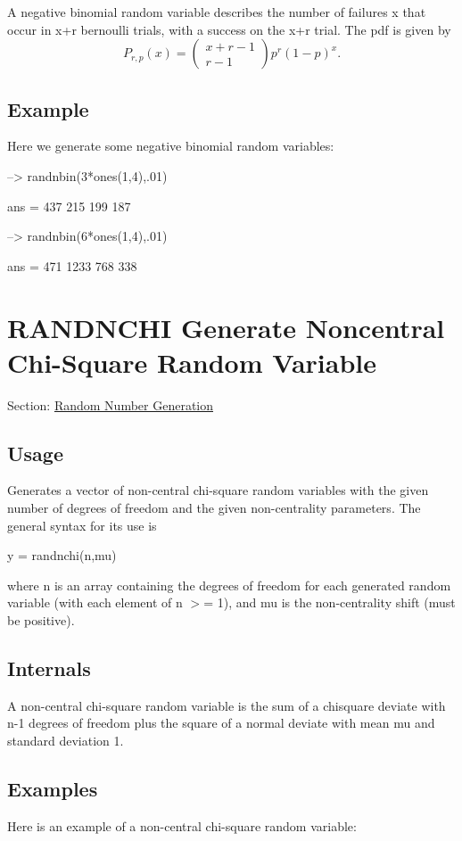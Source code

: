 A negative binomial random variable describes the number of failures {\ttfamily x} that occur in {\ttfamily x+r} bernoulli trials, with a success on the {\ttfamily x+r} trial. The pdf is given by \[ P_{r,p}(x)=\left(\begin{matrix} x+r-1 \\ r-1 \end{matrix}\right)p^r(1-p)^x. \] \hypertarget{variables_struct_Example}{}\subsection{Example}\label{variables_struct_Example}
Here we generate some negative binomial random variables\-:


\begin{DoxyVerbInclude}
--> randnbin(3*ones(1,4),.01)

ans = 
 437 215 199 187 

--> randnbin(6*ones(1,4),.01)

ans = 
  471 1233  768  338 
\end{DoxyVerbInclude}
 \hypertarget{random_randnchi}{}\section{R\-A\-N\-D\-N\-C\-H\-I Generate Noncentral Chi-\/\-Square Random Variable}\label{random_randnchi}
Section\-: \hyperlink{sec_random}{Random Number Generation} \hypertarget{vtkwidgets_vtkxyplotwidget_Usage}{}\subsection{Usage}\label{vtkwidgets_vtkxyplotwidget_Usage}
Generates a vector of non-\/central chi-\/square random variables with the given number of degrees of freedom and the given non-\/centrality parameters. The general syntax for its use is \begin{DoxyVerb}   y = randnchi(n,mu)
\end{DoxyVerb}
 where {\ttfamily n} is an array containing the degrees of freedom for each generated random variable (with each element of {\ttfamily n} $>$= 1), and {\ttfamily mu} is the non-\/centrality shift (must be positive). \hypertarget{transforms_svd_Function}{}\subsection{Internals}\label{transforms_svd_Function}
A non-\/central chi-\/square random variable is the sum of a chisquare deviate with {\ttfamily n-\/1} degrees of freedom plus the square of a normal deviate with mean {\ttfamily mu} and standard deviation 1. \hypertarget{variables_matrix_Examples}{}\subsection{Examples}\label{variables_matrix_Examples}
Here is an example of a non-\/central chi-\/square random variable\-:


